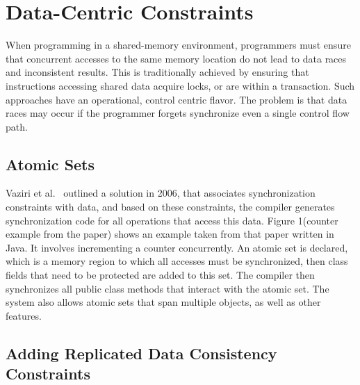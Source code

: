 \documentclass[]{usiinfprospectus}
\begin{document}
\section{Data-Centric Constraints}

When programming in a shared-memory environment, programmers must ensure that concurrent accesses to the same memory location do not lead to data races and inconsistent results. This is traditionally achieved by ensuring that instructions accessing shared data acquire locks, or are within a transaction. Such approaches have an operational, control centric flavor. The problem is that data races may occur if the programmer forgets synchronize even a single control flow path.

\subsection{Atomic Sets}
Vaziri et al.~\cite{Vaziri:2006:ASC:1111320.1111067} outlined a solution in 2006, that associates synchronization constraints with data, and based on these constraints, the compiler generates synchronization code for all operations that access this data. Figure 1(counter example from the paper) shows an example taken from that paper written in Java. It involves incrementing a counter concurrently. An atomic set is declared, which is a memory region to which all accesses must be synchronized, then class fields that need to be protected are added to this set. The compiler then synchronizes all public class methods that interact with the atomic set. The system also allows atomic sets that span multiple objects, as well as other features. 

\subsection{Adding Replicated Data Consistency Constraints}
\end{document}
